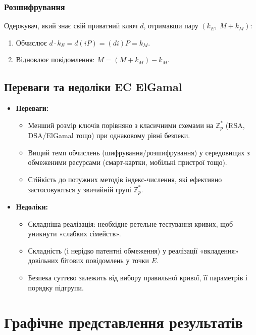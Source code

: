\documentclass[12pt]{report}
\theoremstyle{definition}
\theoremstyle{plain}
\begin{document}
\subsection{Розшифрування}
Одержувач, який знає свій приватний ключ \(d\), отримавши пару \((k_E, \; M + k_M)\):
\begin{enumerate}
    \item Обчислює \(d \cdot k_E = d(iP) = (di)P = k_M\).
    \item Відновлює повідомлення: \(M = (M + k_M) - k_M\).
\end{enumerate}

\section{Переваги та недоліки EC ElGamal}

\begin{itemize}
    \item \textbf{Переваги:}   
    \begin{itemize}
        \item Менший розмір ключів порівняно з класичними схемами на \(\mathbb{Z}_p^*\) (RSA, DSA/ElGamal тощо) при однаковому рівні безпеки.
        \item Вищий темп обчислень (шифрування/розшифрування) у середовищах з обмеженими ресурсами (смарт-картки, мобільні пристрої тощо).
        \item Стійкість до потужних методів індекс-числення, які ефективно застосовуються у звичайній групі \(\mathbb{Z}_p^*\).
    \end{itemize}

    \item \textbf{Недоліки:}  
    \begin{itemize}
        \item Складніша реалізація: необхідне ретельне тестування кривих, щоб уникнути «слабких сімейств».
        \item Складність (і нерідко патентні обмеження) у реалізації «вкладення» довільних бітових повідомлень у точки \(E\).
        \item Безпека суттєво залежить від вибору правильної кривої, її параметрів і порядку підгрупи.
    \end{itemize}
\end{itemize}

\chapter{Графічне представлення результатів}
\end{document}
